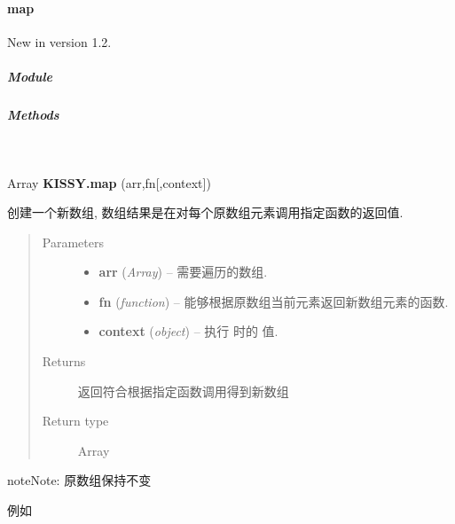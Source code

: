 \documentclass[letterpaper,10pt,english]{sphinxmanual}
\begin{document}
\paragraph{map}
\label{api/seed/lang/map:map}\label{api/seed/lang/map::doc}New in version 1.2.

\subparagraph{Module}
\label{api/seed/lang/map:module}\begin{quote}

{\hyperref[api/seed/lang/index:module-Lang]{}}
\end{quote}


\subparagraph{Methods}
\label{api/seed/lang/map:methods}

\begin{fulllineitems}
\label{api/seed/lang/map:Lang.KISSY.map}~
\begin{DUlineblock}{0em}
\item[] Array \textbf{KISSY.map} (arr,fn{[},context{]})
\item[] 创建一个新数组, 数组结果是在对每个原数组元素调用指定函数的返回值.
\end{DUlineblock}
\begin{quote}\begin{description}
\item[{Parameters}] \leavevmode\begin{itemize}
\item {}
\textbf{arr} (\emph{Array}) -- 需要遍历的数组.

\item {}
\textbf{fn} (\emph{function}) -- 能够根据原数组当前元素返回新数组元素的函数.

\item {}
\textbf{context} (\emph{object}) -- 执行  时的  值.

\end{itemize}

\item[{Returns}] \leavevmode
返回符合根据指定函数调用得到新数组

\item[{Return type}] \leavevmode
Array

\end{description}\end{quote}

\begin{notice}{note}{Note:}
原数组保持不变

例如


\end{notice}
\end{fulllineitems}
\end{document}
